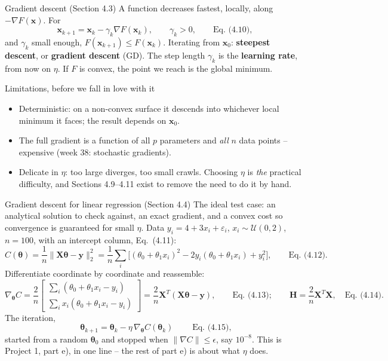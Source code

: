 \documentclass[10pt,aspectratio=169]{beamer}
\begin{document}
\begin{frame}{Gradient descent (Section 4.3)}
A function decreases fastest, locally, along $-\nabla F(\bm{x})$.  For
\[
  \bm{x}_{k+1}=\bm{x}_k-\gamma_k\nabla F(\bm{x}_k),\qquad\gamma_k>0,
  \qquad\text{Eq.~(4.10)},
\]
and $\gamma_k$ small enough, $F(\bm{x}_{k+1})\le F(\bm{x}_k)$.  Iterating
from $\bm{x}_0$: \textbf{steepest descent}, or \textbf{gradient descent}
(GD).  The step length $\gamma_k$ is the \textbf{learning rate}, from now on
$\eta$.  If $F$ is convex, the point we reach is the global minimum.
\vspace{4pt}
\begin{block}{Limitations, before we fall in love with it}
\begin{itemize}
  \item Deterministic: on a non-convex surface it descends into whichever
        local minimum it faces; the result depends on $\bm{x}_0$.
  \item The full gradient is a function of all $p$ parameters and \emph{all}
        $n$ data points -- expensive (week 38: stochastic gradients).
  \item Delicate in $\eta$: too large diverges, too small crawls.  Choosing
        $\eta$ is \emph{the} practical difficulty, and Sections 4.9--4.11
        exist to remove the need to do it by hand.
\end{itemize}
\end{block}
\end{frame}

\begin{frame}{Gradient descent for linear regression (Section 4.4)}
\small
The ideal test case: an analytical solution to check against, an exact
gradient, and a convex cost so convergence is guaranteed for small $\eta$.
Data $y_i=4+3x_i+\varepsilon_i$, $x_i\sim\mathcal{U}(0,2)$, $n=100$, with an
intercept column, Eq.~(4.11):
\[
  C(\bm{\theta})=\frac{1}{n}\|\bm{X}\bm{\theta}-\bm{y}\|_2^2
  =\frac{1}{n}\sum_i\bigl[(\theta_0+\theta_1x_i)^2-2y_i(\theta_0+\theta_1x_i)+y_i^2\bigr],
  \qquad\text{Eq.~(4.12)}.
\]
Differentiate coordinate by coordinate and reassemble:
\[
  \nabla_{\bm{\theta}}C=\frac{2}{n}\begin{bmatrix}
    \sum_i(\theta_0+\theta_1x_i-y_i)\\
    \sum_i x_i(\theta_0+\theta_1x_i-y_i)\end{bmatrix}
  =\frac{2}{n}\bm{X}^T(\bm{X}\bm{\theta}-\bm{y}),\qquad\text{Eq.~(4.13)};
  \qquad
  \bm{H}=\frac{2}{n}\bm{X}^T\bm{X},\quad\text{Eq.~(4.14)}.
\]
The iteration,
\[
  \boxed{\;\bm{\theta}_{k+1}=\bm{\theta}_k-\eta\,\nabla_{\bm{\theta}}C(\bm{\theta}_k)\;}
  \qquad\text{Eq.~(4.15)},
\]
started from a random $\bm{\theta}_0$ and stopped when
$\|\nabla C\|\le\epsilon$, say $10^{-8}$.  This is Project 1, part e), in
one line -- the rest of part e) is about what $\eta$ does.
\end{frame}
\end{document}
